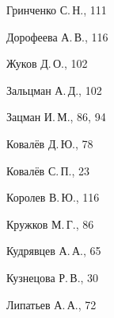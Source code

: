 \begin{theindex}
  \item Гринченко С.\,Н., 111





  \indexspace





  \item Дорофеева А.\,В., 116





  \indexspace





  \item Жуков Д.\,О., 102





  \indexspace





  \item Зальцман А.\,Д., 102


  \item Зацман И.\,М., 86, 94





  \indexspace





  \item Ковалёв Д.\,Ю., 78


  \item Ковалёв С.\,П., 23


  \item Королев В.\,Ю., 116


  \item Кружков М.\,Г., 86


  \item Кудрявцев А.\,А., 65


  \item Кузнецова Р.\,В., 30





  \indexspace





  \item Липатьев А.\,А., 72





  \indexspace






\end{theindex}
